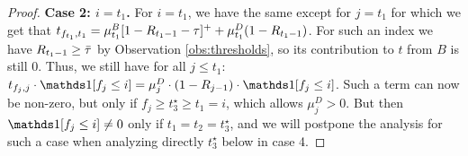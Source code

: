 \begin{proof}
    \smallskip
    \noindent\textbf{Case 2: $i=t_1$.} For $i = t_1$, we have the same except for $j=t_1$ for which we get that $t_{f_{t_1},t_1} = \mu_{t_1}^B [1-R_{t_1-1}-\tau]^+ + \mu_{t_1}^D (1-R_{t_1-1})$. For such an index we have $R_{t_1-1}\geq \bar\tau$ by Observation \ref{obs:thresholds}, so its contribution to $t$ from $B$ is still $0$. Thus, we still have for all $j\leq t_1$: $t_{f_{j}, j} \cdot \ind[f_j \leq i] = \mu_j^D \cdot (1 - R_{j - 1}) \cdot \ind[f_j \leq i]$. 
    Such a term can now be non-zero, but only if $f_j \geq t_3^\star \geq t_1 = i$, which allows $\mu_j^D > 0$.
    But then $\ind[f_j \leq i] \neq 0$ only if $t_1 = t_2 = t_3^\star$, and we will postpone the analysis for such a case when analyzing directly $t_3^\star$ below in case 4.


\end{proof}
